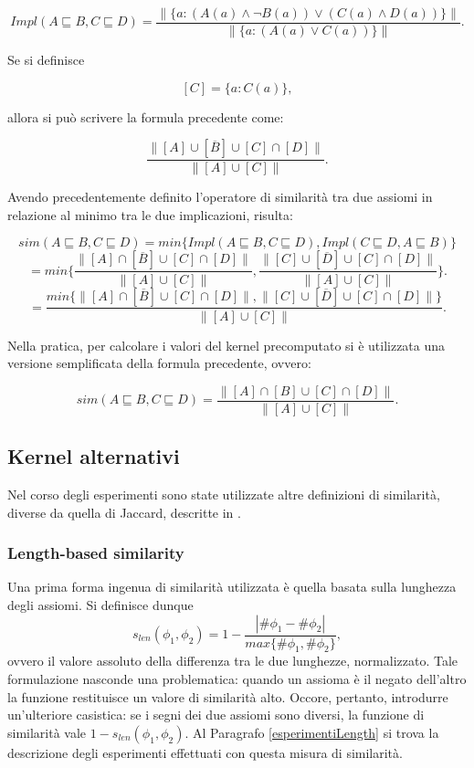 \documentclass[12pt,a4paper]{report}
\begin{document}
\[Impl(A \sqsubseteq B, C \sqsubseteq D) = \frac{\parallel \{ a: (A(a) \land \lnot B(a)) \lor (C(a) \land D(a)) \} \parallel}{\parallel \{ a: (A(a) \lor C(a))\} \parallel}. \]

Se si definisce

\[ [C] = \{a : C(a) \},\]

allora si può scrivere la formula precedente come:

\[ \frac{\parallel [A] \cup [\overline{B}] \cup [C] \cap [D] \parallel}{\parallel [A] \cup [C] \parallel}.\]

Avendo precedentemente definito l'operatore di similarità tra due assiomi in relazione al minimo tra le due implicazioni, risulta:

\[ sim(A \sqsubseteq B, C  \sqsubseteq D) = min\{Impl(A \sqsubseteq B, C\sqsubseteq D), Impl( C\sqsubseteq D, A \sqsubseteq B)\} \]
\[ = min\bigg\{\frac{\parallel [A] \cap [\overline{B}] \cup [C] \cap [D] \parallel}{\parallel [A] \cup [C] \parallel}, \frac{\parallel [C] \cup [\overline{D}] \cup [C] \cap [D] \parallel}{\parallel [A] \cup [C] \parallel}\bigg\}.\]
\[ = \frac{min\{\parallel [A] \cap [\overline{B}] \cup [C] \cap [D] \parallel, \parallel [C] \cup [\overline{D}] \cup [C] \cap [D] \parallel\}}{\parallel [A] \cup [C] \parallel}.\]

Nella pratica, per calcolare i valori del kernel precomputato si è utilizzata una versione semplificata della formula precedente, ovvero:

\[sim(A \sqsubseteq B, C  \sqsubseteq D) = \frac{\parallel [A] \cap [B] \cup [C] \cap [D] \parallel}{\parallel [A] \cup [C] \parallel}. \]


\subsection{Kernel alternativi}
Nel corso degli esperimenti sono state utilizzate altre definizioni di similarità, diverse da quella di Jaccard, descritte in \cite{drtpaper}.
\subsubsection{Length-based similarity}
\label{lengthSection}
Una prima forma ingenua di similarità utilizzata è quella basata sulla lunghezza degli assiomi.
Si definisce dunque
\[ s_{len}(\phi_1, \phi_2) = 1 - \frac{|\# \phi_1 - \# \phi_2|}{max\{\#\phi_1, \#\phi_2\}},\]
ovvero il valore assoluto della differenza tra le due lunghezze, normalizzato.
Tale formulazione nasconde una problematica: quando un assioma è il negato dell'altro la funzione restituisce un valore di similarità alto. Occore, pertanto, introdurre un'ulteriore casistica: se i segni dei due assiomi sono diversi, la funzione di similarità vale $1 - s_{len}(\phi_1,\phi_2)$. Al Paragrafo \ref{esperimentiLength} si trova la descrizione degli esperimenti effettuati con questa misura di similarità.
\end{document}
